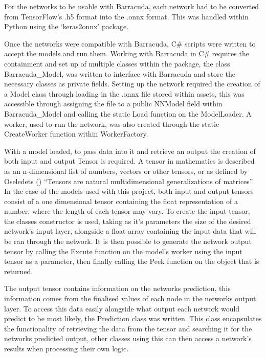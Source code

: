 \documentclass[11pt, a4paper]{article}
\newcommand{\cciteyear}[1]{(\citeyear{#1})}
\begin{document}
For the networks to be usable with Barracuda, each network had to be converted from TensorFlow's .h5 format into the .onnx format. This was handled within Python using the `keras2onnx' package. 

Once the networks were compatible with Barracuda, C\# scripts were written to accept the models and run them. Working with Barracuda in C\# requires the containment and set up of multiple classes within the package, the class Barracuda\_Model, was written to interface with Barracuda and store the necessary classes as private fields. Setting up the network required the creation of a Model class through loading in the .onnx file stored within assets, this was accessible through assigning the file to a public NNModel field within Barracuda\_Model and calling the static Load function on the ModelLoader. A worker, used to run the network, was also created through the static CreateWorker function within WorkerFactory.

\hfill

With a model loaded, to pass data into it and retrieve an output the creation of both input and output Tensor is required. A tensor in mathematics is described as an n-dimensional list of numbers, vectors or other tensors, or as defined by Oseledets \cciteyear{oseledets2011tensor} ``Tensors are natural multidimensional generalizations of matrices''. In the case of the models used with this project, both input and output tensors consist of a one dimensional tensor containing the float representation of a number, where the length of each tensor may vary. To create the input tensor, the classes constructor is used, taking as it's parameters the size of the desired network's input layer, alongside a float array containing the input data that will be ran through the network. It is then possible to generate the network output tensor by calling the Excute function on the model's worker using the input tensor as a parameter, then finally calling the Peek function on the object that is returned.

The output tensor contains information on the networks prediction, this information comes from the finalised values of each node in the networks output layer. To access this data easily alongside what output each network would predict to be most likely, the Prediction class was written. This class encapsulates the functionality of retrieving the data from the tensor and searching it for the networks predicted output, other classes using this can then access a network's results when processing their own logic.     
\end{document}
